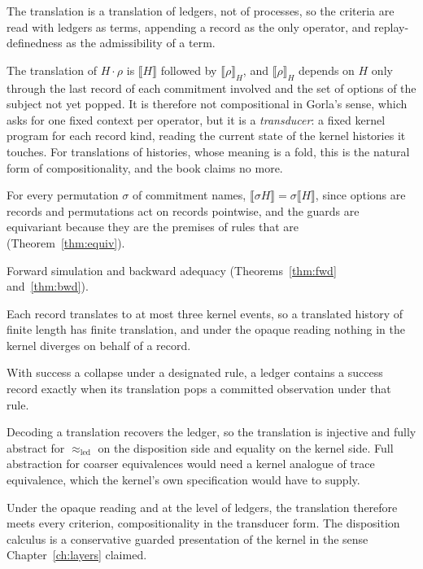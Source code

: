 \documentclass[11pt,openany]{book}
\theoremstyle{remark}
\begin{document}
The translation is a translation of ledgers, not of processes, so the
criteria are read with ledgers as terms, appending a record as the only
operator, and replay-definedness as the admissibility of a term.

\begin{description}[leftmargin=1.5em,style=nextline]
\item[Compositionality, in the form appropriate to histories.] The
translation of $H\cdot\rho$ is $\llbracket H\rrbracket$ followed by
$\llbracket\rho\rrbracket_H$, and $\llbracket\rho\rrbracket_H$ depends on
$H$ only through the last record of each commitment involved and the set
of options of the subject not yet popped. It is therefore not
compositional in Gorla's sense, which asks for one fixed context per
operator, but it is a \emph{transducer}: a fixed kernel program for each
record kind, reading the current state of the kernel histories it
touches. For translations of histories, whose meaning is a fold, this is
the natural form of compositionality, and the book claims no more.
\item[Name invariance.] For every permutation $\sigma$ of commitment
names, $\llbracket\sigma H\rrbracket=\sigma\llbracket H\rrbracket$, since
options are records and permutations act on records pointwise, and the
guards are equivariant because they are the premises of rules that are
(Theorem~\ref{thm:equiv}).
\item[Operational correspondence.] Forward simulation and backward
adequacy (Theorems~\ref{thm:fwd} and~\ref{thm:bwd}).
\item[Divergence reflection.] Each record translates to at most three
kernel events, so a translated history of finite length has finite
translation, and under the opaque reading nothing in the kernel diverges
on behalf of a record.
\item[Success sensitiveness.] With success a collapse under a designated
rule, a ledger contains a success record exactly when its translation
pops a committed observation under that rule.
\item[Injectivity.] Decoding a translation recovers the ledger, so the
translation is injective and fully abstract for $\approx_{\mathrm{led}}$
on the disposition side and equality on the kernel side. Full abstraction
for coarser equivalences would need a kernel analogue of trace
equivalence, which the kernel's own specification would have to supply.
\end{description}

Under the opaque reading and at the level of ledgers, the translation
therefore meets every criterion, compositionality in the transducer form.
The disposition calculus is a conservative guarded presentation of the
kernel in the sense Chapter~\ref{ch:layers} claimed.
\end{document}
